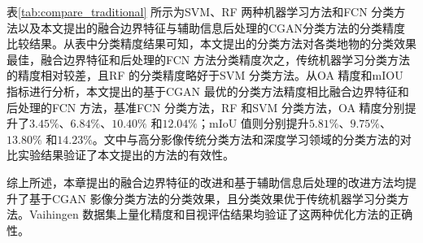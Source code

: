 表\ref{tab:compare_traditional} 所示为SVM、RF 两种机器学习方法和FCN 分类方法以及本文提出的融合边界特征与辅助信息后处理的CGAN分类方法的分类精度比较结果。从表中分类精度结果可知，本文提出的分类方法对各类地物的分类效果最佳，融合边界特征和后处理的FCN 方法分类精度次之，传统机器学习分类方法的精度相对较差，且RF 的分类精度略好于SVM 分类方法。从OA 精度和mIOU 指标进行分析，本文提出的基于CGAN 最优的分类方法精度相比融合边界特征和后处理的FCN 方法，基准FCN 分类方法，RF 和SVM 分类方法，OA 精度分别提升了$3.45\%$、$6.84\%$、$10.40\%$ 和$12.04\%$；mIoU 值则分别提升$5.81\%$、$9.75\%$、$13.80\%$ 和$14.23\%$。文中与高分影像传统分类方法和深度学习领域的分类方法的对比实验结果验证了本文提出的方法的有效性。

\begin{table}[!h]
    \centering
    \caption{本文方法与其他方法分类精度比较}\label{tab:compare_traditional}
\end{table}

综上所述，本章提出的融合边界特征的改进和基于辅助信息后处理的改进方法均提升了基于CGAN 影像分类方法的分类效果，且分类效果优于传统机器学习分类方法。Vaihingen 数据集上量化精度和目视评估结果均验证了这两种优化方法的正确性。


